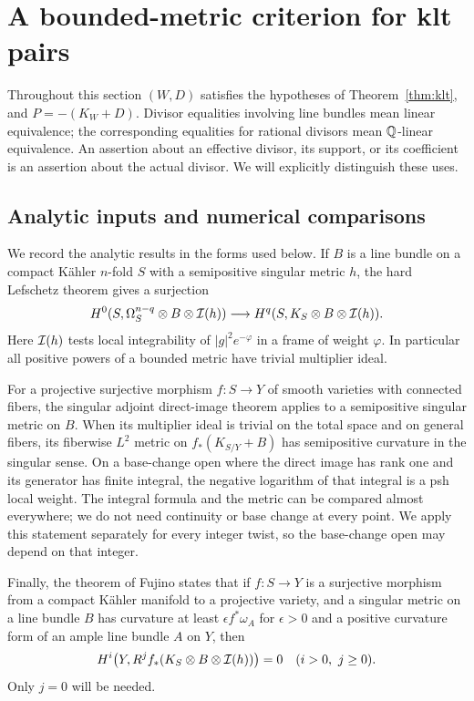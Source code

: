 \section{A bounded-metric criterion for klt pairs}\label{sec:criterion}

Throughout this section $(W,D)$ satisfies the hypotheses of Theorem~\ref{thm:klt}, and $P=-(K_W+D)$. Divisor equalities involving line bundles mean linear equivalence; the corresponding equalities for rational divisors mean $\mathbb Q$-linear equivalence. An assertion about an effective divisor, its support, or its coefficient is an assertion about the actual divisor. We will explicitly distinguish these uses.

\subsection{Analytic inputs and numerical comparisons}\label{subsec:inputs}

We record the analytic results in the forms used below. If $B$ is a line bundle on a compact K\"ahler $n$-fold $S$ with a semipositive singular metric $h$, the hard Lefschetz theorem \cite[Theorem~2.1.1]{DPS2001} gives a surjection
\begin{equation}\label{eq:HL}
H^0(S,\Omega_S^{n-q}\otimes B\otimes\mathcal I(h))
\longrightarrow H^q(S,K_S\otimes B\otimes\mathcal I(h)).
\end{equation}
Here $\mathcal I(h)$ tests local integrability of $|g|^2e^{-\varphi}$ in a frame of weight $\varphi$. In particular all positive powers of a bounded metric have trivial multiplier ideal.

For a projective surjective morphism $f:S\to Y$ of smooth varieties with connected fibers, the singular adjoint direct-image theorem \cite[\S3.2.1 and Theorems~3.3.4--3.3.5]{PaunTakayama2018} applies to a semipositive singular metric on $B$. When its multiplier ideal is trivial on the total space and on general fibers, its fiberwise $L^2$ metric on $f_*(K_{S/Y}+B)$ has semipositive curvature in the singular sense. On a base-change open where the direct image has rank one and its generator has finite integral, the negative logarithm of that integral is a psh local weight. The integral formula and the metric can be compared almost everywhere; we do not need continuity or base change at every point. We apply this statement separately for every integer twist, so the base-change open may depend on that integer.

Finally, the theorem of Fujino \cite[Theorem~1.3]{Fujino2018} states that if $f:S\to Y$ is a surjective morphism from a compact K\"ahler manifold to a projective variety, and a singular metric on a line bundle $B$ has curvature at least $\epsilon f^*\omega_A$ for $\epsilon>0$ and a positive curvature form of an ample line bundle $A$ on $Y$, then
\begin{equation}\label{eq:KN}
H^i\bigl(Y,R^j f_*(K_S\otimes B\otimes\mathcal I(h))\bigr)=0
\quad (i>0,\ j\ge0).
\end{equation}
Only $j=0$ will be needed.


